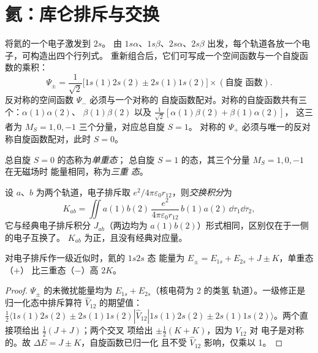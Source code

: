 \section{氦：库仑排斥与交换}

将氦的一个电子激发到 $2s$。
由 $1s\alpha$、$1s\beta$、$2s\alpha$、$2s\beta$ 出发，每个轨道各放一个电子，可构造出四个行列式。
重新组合后，它们可写成一个空间函数与一个自旋函数的乘积：
\[
\Psi_\pm = \frac{1}{\sqrt2}\big[1s(1)2s(2) \pm 2s(1)1s(2)\big]\times(\text{自旋
函数}).
\]
反对称的空间函数 $\Psi_-$ 必须与一个对称的
自旋函数配对。对称的自旋函数共有三个：$\alpha(1)\alpha(2)$、
$\beta(1)\beta(2)$ 以及 $\frac{1}{\sqrt2}[\alpha(1)\beta(2) + \beta(1)\alpha(2)]$，
这三者为 $M_S = 1, 0, -1$ 三个分量，对应总自旋 $S = 1$。
对称的 $\Psi_+$ 必须与唯一的反对称自旋函数配对，此时 $S = 0$。

\begin{definition}[单重态与三重态]\label{def:b3:many-electron-atoms:singlet-triplet}
总自旋 $S = 0$ 的态称为\emph{单重态}；
总自旋 $S = 1$ 的态，其三个分量 $M_S = 1, 0, -1$ 在无磁场时
能量相同，称为\emph{三重
态}。
\end{definition}

\begin{definition}[交换积分]\label{def:b3:many-electron-atoms:exchange}
设 $a$、$b$ 为两个轨道，电子排斥取 $e^2/4\pi\varepsilon_0
r_{12}$，则\emph{交换积分}为
\[
K_{ab} = \iint a(1)b(2)\,\frac{e^2}{4\pi\varepsilon_0r_{12}}\,b(1)a(2)\,\dd\tau_1\dd\tau_2,
\]
它与经典电子排斥积分 $J_{ab}$（两边均为
$a(1)b(2)$）形式相同，区别仅在于一侧的电子互换了。
$K_{ab}$ 为正，且没有经典对应量。
\end{definition}

\begin{proposition}[单重态与三重态的能量]\label{prop:b3:many-electron-atoms:helium}
对电子排斥作一级近似时，氦的 $1s2s$ 态
能量为 $E_\pm = E_{1s} + E_{2s} + J \pm K$，单重态（$+$）
比三重态（$-$）高 $2K$。
\end{proposition}

\begin{proof}
$\Psi_\pm$ 的未微扰能量均为 $E_{1s} + E_{2s}$（核电荷为 2 的类氢
轨道）。一级修正是
归一化态中排斥算符 $\hat V_{12}$ 的期望值：
$\frac12\langle 1s(1)2s(2) \pm 2s(1)1s(2)|\hat V_{12}|1s(1)2s(2) \pm
2s(1)1s(2)\rangle$。两个直接项给出 $\frac12(J + J)$；两个交叉
项给出 $\pm\frac12(K + K)$，因为 $\hat V_{12}$ 对
电子是对称的。故 $\Delta E = J \pm K$，自旋函数已归一化
且不受 $\hat V_{12}$ 影响，仅乘以 1。
\end{proof}

